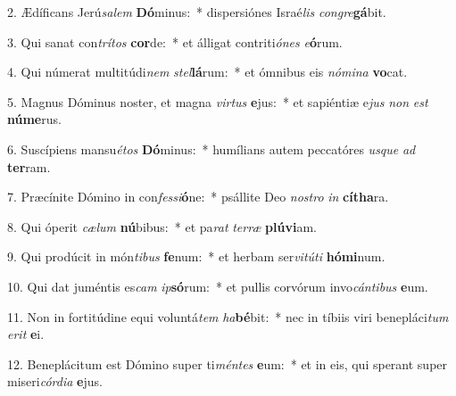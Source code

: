 2. Ædíficans Jerú\textit{sa}\textit{lem} \textbf{Dó}minus:~*  dispersiónes Israé\textit{lis} \textit{con}\textit{gre}\textbf{gá}bit.\

3. Qui sanat con\textit{trí}\textit{tos} \textbf{cor}de:~*  et álligat contriti\textit{ó}\textit{nes} \textit{e}\textbf{ó}rum.\

4. Qui númerat multitúdi\textit{nem} \textit{stel}\textbf{lá}rum:~*  et ómnibus eis \textit{nó}\textit{mi}\textit{na} \textbf{vo}cat.\

5. Magnus Dóminus noster, et magna \textit{vir}\textit{tus} \textbf{e}jus:~*  et sapiéntiæ e\textit{jus} \textit{non} \textit{est} \textbf{nú}\textbf{me}rus.\

6. Suscípiens mansu\textit{é}\textit{tos} \textbf{Dó}minus:~*  humílians autem peccatóres \textit{us}\textit{que} \textit{ad} \textbf{ter}ram.\

7. Præcínite Dómino in con\textit{fes}\textit{si}\textbf{ó}ne:~*  psállite Deo \textit{nos}\textit{tro} \textit{in} \textbf{cí}\textbf{tha}ra.\

8. Qui óperit \textit{cæ}\textit{lum} \textbf{nú}bibus:~*  et pa\textit{rat} \textit{ter}\textit{ræ} \textbf{plú}\textbf{vi}am.\

9. Qui prodúcit in món\textit{ti}\textit{bus} \textbf{fe}num:~*  et herbam ser\textit{vi}\textit{tú}\textit{ti} \textbf{hó}\textbf{mi}num.\

10. Qui dat juméntis es\textit{cam} \textit{ip}\textbf{só}rum:~*  et pullis corvórum invo\textit{cán}\textit{ti}\textit{bus} \textbf{e}um.\

11. Non in fortitúdine equi voluntá\textit{tem} \textit{ha}\textbf{bé}bit:~*  nec in tíbiis viri benepláci\textit{tum} \textit{e}\textit{rit} \textbf{e}i.\

12. Beneplácitum est Dómino super ti\textit{mén}\textit{tes} \textbf{e}um:~*  et in eis, qui sperant super miseri\textit{cór}\textit{di}\textit{a} \textbf{e}jus.\

